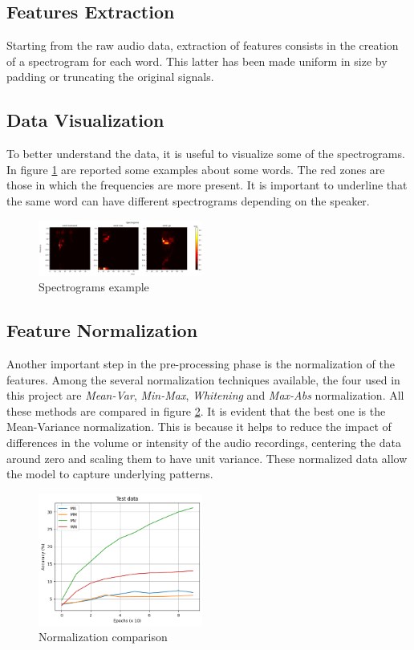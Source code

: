 \documentclass{article}
\begin{document}
\begin{multicols}{2}
\subsection{Features Extraction}
Starting from the raw audio data, extraction of features consists in the creation of a spectrogram for each word. This latter has been made uniform in size by padding or truncating the original signals.

\subsection{Data Visualization}
To better understand the data, it is useful to visualize some of the spectrograms. In figure \ref{fig:spec_examples} are reported some examples about some words.
The red zones are those in which the frequencies are more present. It is important to underline that the same word can have different spectrograms depending on the speaker.

    \begin{figure}[H]
        \centering
        \includegraphics[width=0.48\textwidth]{spectrograms_sample.png}
        \caption{\small Spectrograms example }
        \label{fig:spec_examples}
    \end{figure}

\subsection{Feature Normalization}
Another important step in the pre-processing phase is the normalization of the features. Among the several normalization techniques available, the four used in this project 
are \textit{Mean-Var}, \textit{Min-Max}, \textit{Whitening} and \textit{Max-Abs} normalization. All these methods are compared in figure \ref{fig:normcomptest}. 
It is evident that the best one is the Mean-Variance normalization.
This is because it helps to reduce the impact of differences in the volume or intensity of the audio recordings, centering the data around zero and 
scaling them to have unit variance. These normalized data allow the model to capture underlying patterns.

    \begin{figure}[H]
        \centering
        \includegraphics[width=0.48\textwidth]{norm_comp_test.png}
        \caption{\small Normalization comparison}
        \label{fig:normcomptest}
    \end{figure}



\end{multicols}
\end{document}
